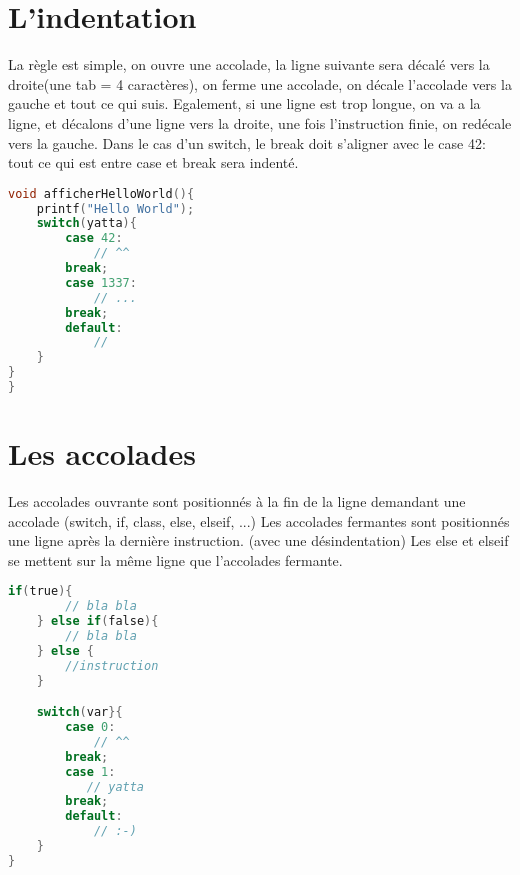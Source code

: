 \section{L'indentation}
La règle est simple, on ouvre une accolade, la ligne suivante sera décalé vers la droite(une tab = 4 caractères), on ferme une accolade, on décale l'accolade vers la gauche et tout ce qui suis. 
Egalement, si une ligne est trop longue, on va a la ligne, et décalons d'une ligne vers la droite, une fois l'instruction finie, on redécale vers la gauche.
Dans le cas d'un switch, le break doit s'aligner avec le case 42: tout ce qui est entre case et break sera indenté. 

\begin{lstlisting}[language=C, caption=Exemple d'indentation]
void afficherHelloWorld(){
    printf("Hello World");
    switch(yatta){
        case 42:
            // ^^
        break;
        case 1337:
            // ...
        break;
        default: 
            //
    }
}
}\end{lstlisting}

\section{Les accolades}
Les accolades ouvrante sont positionnés à la fin de la ligne demandant une accolade (switch, if, class, else, elseif, ...)
Les accolades fermantes sont positionnés une ligne après la dernière instruction. (avec une désindentation)
Les else et elseif se mettent sur la même ligne que l'accolades fermante. 

\begin{lstlisting}[language=C, caption=Exemple d'indentation]
    if(true){
        // bla bla
    } else if(false){
        // bla bla 
    } else {
        //instruction
    } 

    switch(var}{
        case 0:
            // ^^
        break;
        case 1:
           // yatta
        break;
        default:
            // :-)
    }
} \end{lstlisting}
